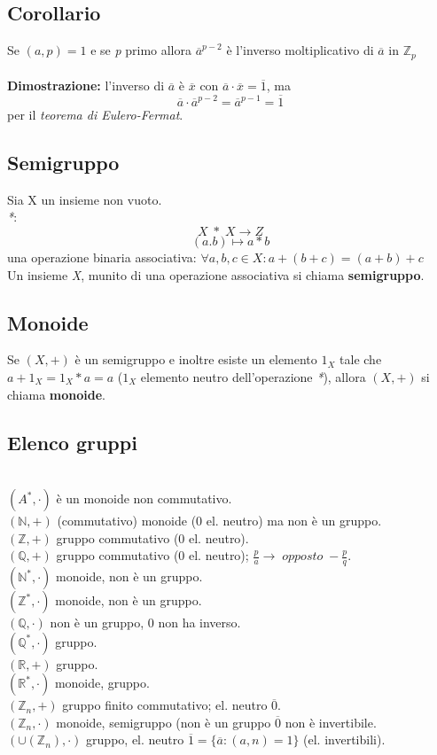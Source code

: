 \subsection{Corollario}
Se \((a,p)=1\) e se \textit{p} primo allora \(\overline{a}^{p-2}\) è l'inverso moltiplicativo di \(\overline{a}\) in \(\mathbb{Z}_p\)
\\\\
\textbf{Dimostrazione:} l'inverso di \(\overline{a}\) è \(\overline{x}\) con \(\overline{a}\cdot\overline{x}=\overline{1}\), 
ma \[\overline{a}\cdot\overline{a}^{p-2}=\overline{a}^{p-1}=\overline{1}\]
per il \textit{teorema di Eulero-Fermat}.

\subsection{Semigruppo}
Sia X un insieme non vuoto. 
\\\textit{*}:
\[X\;*\;X\rightarrow Z\]
\[(a.b)\mapsto a * b\]
una operazione binaria associativa: \(\forall a,b,c\in X: a+(b+c)=(a+b)+c\)
\\
Un insieme \textit{X}, munito di una operazione associativa si chiama \textbf{semigruppo}.

\subsection{Monoide}
Se \((X,+)\) è un semigruppo e inoltre esiste un elemento \(1_X\) tale che \(a+1_X=1_X*a=a\) (\(1_X\) elemento neutro dell'operazione \textit{*}), allora \((X,+)\) si chiama \textbf{monoide}.

\subsection{Elenco gruppi}
\\\textbf{\((A^*, \cdot )\)} è un monoide non commutativo.
\\\textbf{\((\mathbb{N}, +) \)} (commutativo) monoide (0 el. neutro) ma non è un gruppo.
\\\textbf{\( (\mathbb{Z}, +)\)} gruppo commutativo (0 el. neutro).
\\\textbf{\((\mathbb{Q}, +) \)} gruppo commutativo (0 el. neutro); \(\frac{p}{a}\rightarrow\;opposto\;-\frac{p}{q}\).
\\\textbf{\((\mathbb{N}^*, \cdot)\)} monoide, non è un gruppo.
\\\textbf{\((\mathbb{Z}^*, \cdot)\)} monoide, non è un gruppo.
\\\textbf{\((\mathbb{Q}, \cdot)\)} non è un gruppo, 0 non ha inverso.
\\\textbf{\((\mathbb{Q}^*,\cdot)\)} gruppo.
\\\textbf{\((\mathbb{R}, +)\)} gruppo.
\\\textbf{\((\mathbb{R}^*, \cdot)\)} monoide, gruppo.
\\\textbf{\((\mathbb{Z}_n, +)\)} gruppo finito commutativo; el. neutro \(\overline{0}\).
\\\textbf{\((\mathbb{Z}_n,\cdot)\)} monoide, semigruppo (non è un gruppo \(\overline{0}\) non è invertibile.
\\\textbf{\((\cup (\mathbb{Z}_n),\cdot) \)} gruppo, el. neutro \(\overline{1}=\{\overline{a}: (a,n)=1\}\) (el. invertibili).
